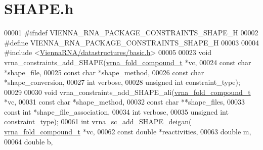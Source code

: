 \hypertarget{SHAPE_8h_source}{}\section{S\+H\+A\+P\+E.\+h}
\label{SHAPE_8h_source}

\begin{DoxyCode}
00001 \textcolor{preprocessor}{#ifndef VIENNA\_RNA\_PACKAGE\_CONSTRAINTS\_SHAPE\_H}
00002 \textcolor{preprocessor}{#define VIENNA\_RNA\_PACKAGE\_CONSTRAINTS\_SHAPE\_H}
00003 
00004 \textcolor{preprocessor}{#include <\hyperlink{datastructures_2basic_8h}{ViennaRNA/datastructures/basic.h}>}
00005 
00023 \textcolor{keywordtype}{void} vrna\_constraints\_add\_SHAPE(\hyperlink{group__fold__compound_structvrna__fc__s}{vrna\_fold\_compound\_t} *vc,
00024                                 \textcolor{keyword}{const} \textcolor{keywordtype}{char} *shape\_file,
00025                                 \textcolor{keyword}{const} \textcolor{keywordtype}{char} *shape\_method,
00026                                 \textcolor{keyword}{const} \textcolor{keywordtype}{char} *shape\_conversion,
00027                                 \textcolor{keywordtype}{int} verbose,
00028                                 \textcolor{keywordtype}{unsigned} \textcolor{keywordtype}{int} constraint\_type);
00029 
00030 \textcolor{keywordtype}{void} vrna\_constraints\_add\_SHAPE\_ali(\hyperlink{group__fold__compound_structvrna__fc__s}{vrna\_fold\_compound\_t} *vc,
00031                                     \textcolor{keyword}{const} \textcolor{keywordtype}{char} *shape\_method,
00032                                     \textcolor{keyword}{const} \textcolor{keywordtype}{char} **shape\_files,
00033                                     \textcolor{keyword}{const} \textcolor{keywordtype}{int}  *shape\_file\_association,
00034                                     \textcolor{keywordtype}{int} verbose,
00035                                     \textcolor{keywordtype}{unsigned} \textcolor{keywordtype}{int} constraint\_type);
00061 \textcolor{keywordtype}{int} \hyperlink{group__SHAPE__reactivities_ga57d612b58e1c61dd6cfcb5a843f8f1b3}{vrna\_sc\_add\_SHAPE\_deigan}( \hyperlink{group__fold__compound_structvrna__fc__s}{vrna\_fold\_compound\_t} *vc,
00062                               \textcolor{keyword}{const} \textcolor{keywordtype}{double} *reactivities,
00063                               \textcolor{keywordtype}{double} m,
00064                               \textcolor{keywordtype}{double} b,

\end{DoxyCode}
